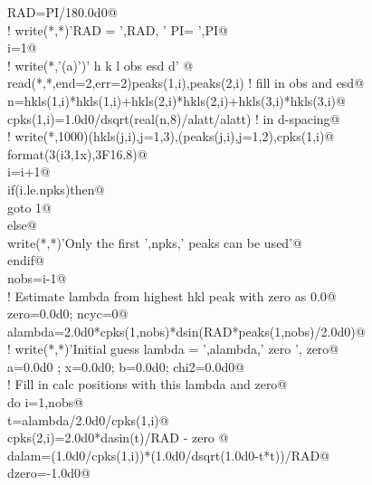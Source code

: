 \documentclass[10pt,a4paper,notitlepage]{article}
\begin{document}
\begin{flushleft}
\begin{list}{}{}
\mbox{}\verb@      RAD=PI/180.0d0@\\
\mbox{}\verb@!      write(*,*)'RAD = ',RAD, ' PI= ',PI@\\
\mbox{}\verb@      i=1@\\
\mbox{}\verb@!      write(*,'(a)')'  h   k   l      obs              esd             d'   @\\
\mbox{}     read(*,*,end=2,err=2)peaks(1,i),peaks(2,i) ! fill in obs and esd@\\
\mbox{}\verb@      n=hkls(1,i)*hkls(1,i)+hkls(2,i)*hkls(2,i)+hkls(3,i)*hkls(3,i)@\\
\mbox{}\verb@      cpks(1,i)=1.0d0/dsqrt(real(n,8)/alatt/alatt) ! in d-spacing@\\
\mbox{}\verb@!      write(*,1000)(hkls(j,i),j=1,3),(peaks(j,i),j=1,2),cpks(1,i)@\\
\mbox{}  format(3(i3,1x),3F16.8)@\\
\mbox{}\verb@      i=i+1@\\
\mbox{}\verb@      if(i.le.npks)then@\\
\mbox{}\verb@        goto 1@\\
\mbox{}\verb@      else@\\
\mbox{}\verb@        write(*,*)'Only the first ',npks,' peaks can be used'@\\
\mbox{}\verb@      endif@\\
\mbox{}     nobs=i-1@\\
\mbox{}\verb@! Estimate lambda from highest hkl peak with zero as 0.0@\\
\mbox{}\verb@      zero=0.0d0; ncyc=0@\\
\mbox{}\verb@      alambda=2.0d0*cpks(1,nobs)*dsin(RAD*peaks(1,nobs)/2.0d0)@\\
\mbox{}\verb@!      write(*,*)'Initial guess lambda = ',alambda,' zero ', zero@\\
\mbox{}     a=0.0d0 ; x=0.0d0; b=0.0d0; chi2=0.0d0@\\
\mbox{}\verb@! Fill in calc positions with this lambda and zero@\\
\mbox{}\verb@      do i=1,nobs@\\
\mbox{}\verb@        t=alambda/2.0d0/cpks(1,i)@\\
\mbox{}\verb@        cpks(2,i)=2.0d0*dasin(t)/RAD - zero @\\
\mbox{}\verb@        dalam=(1.0d0/cpks(1,i))*(1.0d0/dsqrt(1.0d0-t*t))/RAD@\\
\mbox{}\verb@        dzero=-1.0d0@\\

\end{list}
\end{flushleft}
\end{document}
